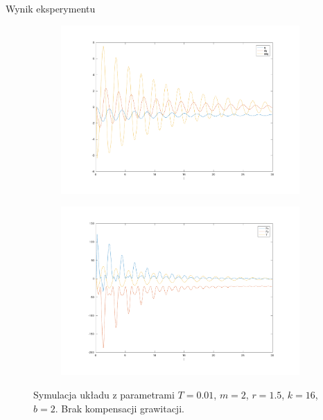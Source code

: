 \documentclass{beamer}
\begin{document}
\begin{frame}[allowframebreaks]{Wynik eksperymentu}
\begin{figure}
	\centering
	\begin{subfigure}{.5\textwidth}
		\centering
		\includegraphics[width=\linewidth]{test_p}
	\end{subfigure}%
	\begin{subfigure}{.5\textwidth}
		\centering
		\includegraphics[width=\linewidth]{test_s}
	\end{subfigure}

	\caption{Symulacja układu z parametrami $T=0.01$, $m = 2$, $r = 1.5$, $k = 16$, $b = 2$. Brak kompensacji grawitacji.}
	\label{fig:system}
\end{figure}

\framebreak


\end{frame}
\end{document}
